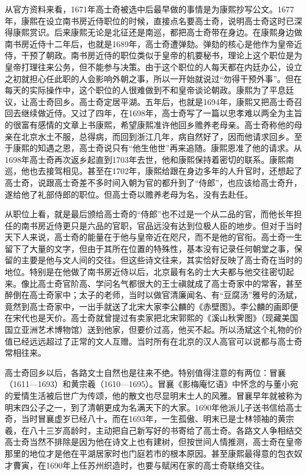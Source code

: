 
从官方资料来看，1671年高士奇被选中后最早做的事情是为康熙抄写公文。1677年，康熙在设立南书房近侍职位的时候，直接点名要高士奇，说明高士奇这时已深得康熙赏识。后来康熙无论是北征还是南巡，都把高士奇带在身边。在康熙身边做南书房近侍十二年后，也就是1689年，高士奇遭弹劾。弹劾的核心是他作为皇帝近侍，干预了朝政。南书房近侍的职位类似于皇帝的机要秘书，理论上这个职位是为皇帝打理往来公务，但不能参与决策。由于这个职位的人每天都在内廷办公，设立之初就担心任此职的人会影响外朝之事，所以一开始就说过“勿得干预外事”。但在每天的实际操作中，这个职位的人很难做到不和皇帝谈论朝政。康熙为了平息廷议，让高士奇回乡。高士奇定居平湖。五年后，也就是1694年，康熙又把高士奇召回去继续做近侍。又过了四年，在1698年，高士奇写了一篇以忠孝难以两全为主旨的很富有感情的文章上书康熙，希望康熙准许他回乡赡养老母亲。高士奇称他的母亲在北京水土不服，总得病，而回到浙江几年，病自然好了，因而他请求回乡。至于康熙的知遇之恩，高士奇说只有“他生他世”再来追随。康熙恩准了他的请求。从1698年高士奇再次返乡起直到1703年去世，他和康熙保持着密切的联系。康熙南巡，他也去接驾相见。甚至在1702年，康熙给跟在身边多年的人升官时，还想起了高士奇，说跟高士奇差不多时间入朝为官的都升到了“侍郎”，也应该给高士奇升，遂给他了礼部侍郎的职位。但高士奇以赡养老母为名，没有去赴任。



从职位上看，就是最后颁给高士奇的“侍郎”也不过是一个从二品的官，而他长年担任的南书房近侍更只是六品的官职，官品远没有达到位极人臣的地步。但对于当时天下人来说，高士奇的能量在于他与皇帝近在咫尺，而不是他的官衔。高士奇一生留下了大量的文字，但由于其所在位置的特殊性，基本没有记录任何朝堂之事，保留的主要是他与文人间的交往。但这些诗文往来，其实恰好反映了高士奇在当时的地位。特别是在他做了南书房近侍以后，北京最有名的士大夫都与他交往密切起来。像比高士奇官阶高、学问名气都很大的王士禛就成了高士奇家中的常客，甚至醉倒在高士奇家中；太子的老师，当时以做官清廉闻名、有“豆腐汤”雅号的汤斌，竟然到高士奇家中，一出手就送了北宋大家李公麟的《赤壁图》。李公麟的画即便在宋代也是天价。高士奇就曾提过有卖家把北宋郭熙的《溪山秋霁图》（现藏美国国立亚洲艺术博物馆）送到他家，但要价过高，他买不起。所以汤斌这个礼物的价值已经远远超过了正常的文人互赠。当时所有在北京的汉人高官可以说都与高士奇常相往来。



高士奇回乡以后，各路文士自然也是往来不绝。特别值得注意的有两位：冒襄（1611—1693）和黄宗羲（1610—1695）。冒襄《影梅庵忆语》中怀念的与董小宛的爱情生活被后世广为传颂，他的散文也尽显明末士人的风雅。冒襄早年就被称为明末四公子之一，到了清朝更成为名满天下的大家。1690年他派儿子送书信给高士奇，当时冒襄虚岁已经八十。而在1693年，一生孤傲、明末已是士林领袖的黄宗羲，在八十三岁高龄时，主动把自己新写好的书寄给了高士奇。各路文人争相结交高士奇当然不排除是因为他在诗文上也有建树，但按世间人情推测，高士奇在皇帝那里的地位才是他在平湖居家时也门庭若市的根本原因。甚至康熙最得意的包衣奴才曹寅，在1690年上任苏州织造时，也要与赋闲在家的高士奇联络交往。


